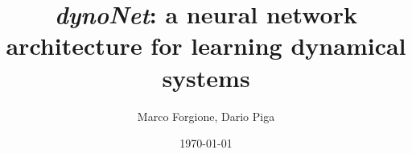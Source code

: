 \usepackage[english]{babel}
\usepackage{amsmath}
\usepackage[latin1]{inputenc}
\usepackage{units}
\usepackage{colortbl}
\usepackage{multimedia}
\usepackage{bm}

{
}

\newcommand{\Name}{\emph{dynoNet}}

\title[\Name]{\Name: a neural network architecture for learning dynamical systems}


\author[]{Marco Forgione, Dario Piga}



\date[]{\today}


\subject{System identification with neural networks}


\newcommand{\q}{q} %
\newcommand{\A}{A} %
\newcommand{\ac}{a} %
\newcommand{\B}{B} %
\newcommand{\bb}{b} %
\newcommand{\Gmat}{\mathbb{G}} %
\newcommand{\tvec}[1]{\mathbf{#1}}
\newcommand{\mat}[1]{\bm{#1}}
\newcommand{\sens}[1]{\tilde{#1}}
\newcommand{\adjoint}[1]{\overline{#1}}
\newcommand{\loss}{\mathcal{L}}
\newcommand{\pdiff}[2]{\frac{\partial #1}{\partial #2}}
\newcommand{\nsamp}{T}

\newcommand{\conv}{*}
\newcommand{\ccorr}{\star}
\newcommand{\norm}[1]{\left \lVert #1 \right \rVert}
\DeclareMathOperator*\argmin{arg \, min}
\DeclareMathOperator*\cov{cov}

